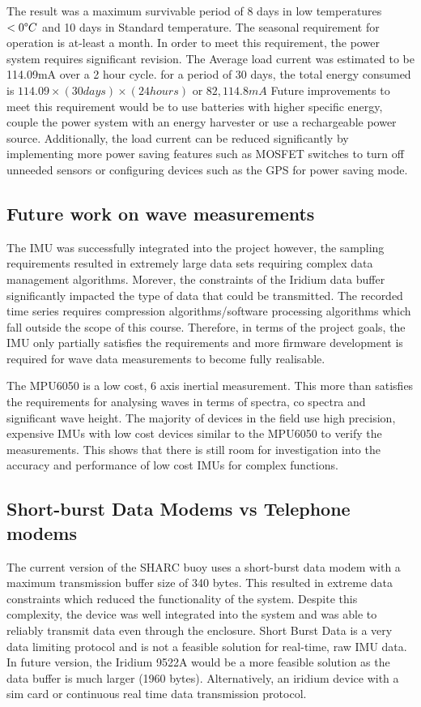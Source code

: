 The result was a maximum survivable period of 8 days in low temperatures $< 0 \degree C$ and 10 days in Standard temperature. The seasonal requirement for operation is at-least a month. In order to meet this requirement, the power system requires significant revision. The Average load current was estimated to be 114.09mA over a 2 hour cycle. for a period of 30 days, the total energy consumed is $114.09 \times (30 days) \times (24 hours)$ or $82,114.8mA$ Future improvements to meet this requirement would be to use batteries with higher specific energy, couple the power system with an energy harvester or use a rechargeable power source. Additionally, the load current can be reduced significantly by implementing more power saving features such as MOSFET switches to turn off unneeded sensors or configuring devices such as the GPS for power saving mode.

\subsection{Future work on wave measurements}

The IMU was successfully integrated into the project however, the sampling requirements resulted in extremely large data sets requiring complex data management algorithms. Morever, the constraints of the Iridium data buffer significantly impacted the type of data that could be transmitted. The recorded time series requires compression algorithms/software processing algorithms which fall outside the scope of this course. Therefore, in terms of the project goals, the IMU only partially satisfies the requirements and more firmware development is required for wave data measurements to become fully realisable.

The MPU6050 is a low cost, 6 axis inertial measurement. This more than satisfies the requirements for analysing waves in terms of spectra, co spectra and significant wave height. The majority of devices in the field use high precision, expensive IMUs with low cost devices similar to the MPU6050 to verify the measurements. This shows that there is still room for investigation into the accuracy and performance of low cost IMUs for complex functions. 

\subsection{Short-burst Data Modems vs Telephone modems}

The current version of the SHARC buoy uses a short-burst data modem with a maximum transmission buffer size of 340 bytes. This resulted in extreme data constraints which reduced the functionality of the system. Despite this complexity, the device was well integrated into the system and was able to reliably transmit data even through the enclosure. Short Burst Data is a very data limiting protocol and is not a feasible solution for real-time, raw IMU data. In future version, the Iridium 9522A would be a more feasible solution as the data buffer is much larger (1960 bytes). Alternatively, an iridium device with a sim card or continuous real time data transmission protocol.\par

